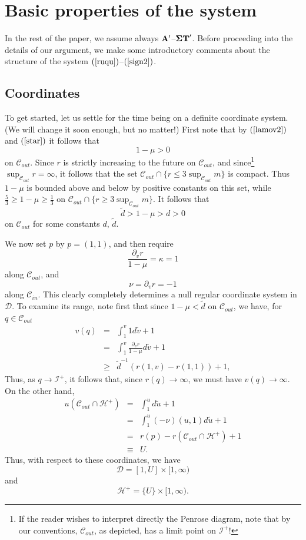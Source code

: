 \documentclass{article}
\begin{document}
\section{Basic properties of the system}
\label{ecsec}
In the rest of the paper, we assume always ${\bf A}'$--${\bf \Sigma T}'$.
Before proceeding into the details of our argument, we make some introductory
comments about the structure of the system $(\ref{ruqu})$--$(\ref{sign2})$.

\subsection{Coordinates}
To get started, let us settle for the time being on a definite coordinate system.
(We will change it soon enough, but no matter!) 
First note that 
by $(\ref{lamov2})$ and $(\ref{star})$
it follows that
\[
1-\mu>0
\]
on $\mathcal{C}_{out}$. 
Since $r$ is strictly increasing to the future on $\mathcal{C}_{out}$, and
since\footnote{If the reader wishes to interpret directly the Penrose diagram, note
that by our conventions, $\mathcal{C}_{out}$, as depicted, has a limit point
on $\mathcal{I}^+$!}  
$\sup_{\mathcal{C}_{out}}r=\infty$, it follows that
the set $\mathcal{C}_{out}\cap\{r\le 3\sup_{\mathcal{C}_{out}}m\}$ is compact.
Thus $1-\mu$ is bounded above and
below by positive constants on this set, while
$\frac53\ge 1-\mu\ge \frac13$ on 
$\mathcal{C}_{out}\cap\{r\ge 3\sup_{\mathcal{C}_{out}}m\}$.
It follows that
\[
\tilde{d}>1-\mu>d>0
\]
on $\mathcal{C}_{out}$ for some constants $d$, $\tilde{d}$.

We now set $p$ by $p=(1,1)$, and then require 
\begin{equation}
\label{INITv}
\frac{\partial_vr}{1-\mu}=\kappa=1
\end{equation}
along $\mathcal{C}_{out}$,
and 
\[
\nu=\partial_vr=-1
\]
along $\mathcal{C}_{in}$. This clearly completely determines a null
regular coordinate
system in $\mathcal{D}$. 
To examine its range, note first that
since $1-\mu<\tilde{d}$ on $\mathcal{C}_{out}$, we
have, for $q\in\mathcal{C}_{out}$
\begin{eqnarray*}
v(q)	&=&	\int_1^v{1d\tilde{v}}+1\\
	&=&	\int_1^v\frac{\partial_vr}{1-\mu}d\tilde{v}+1\\
	&\ge&	\tilde{d}^{-1}(r(1,v)-r(1,1))+1,
\end{eqnarray*}
Thus, as $q\to\mathcal{I}^+$, it follows that, since $r(q)\to\infty$,
we must have $v(q)\to\infty$.
On the other hand, 
\begin{eqnarray*}
u(\mathcal{C}_{out}\cap\mathcal{H}^+)	&=&	\int_1^ud\tilde{u}+1\\
					&=&	\int_1^u(-\nu)(u,1)d\tilde{u}+1\\
					&=&	r(p)-
						r(\mathcal{C}_{out}\cap\mathcal{H}^+)
							+1\\
					&\equiv&	U.
\end{eqnarray*}
Thus, with respect to these coordinates, we have
\[
\mathcal{D}=[1,U]\times[1,\infty)
\]
and 
\[
\mathcal{H}^+=\{U\}\times[1,\infty).
\]
\end{document}
